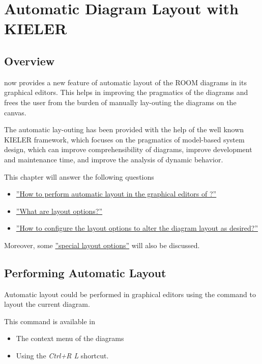 \section{Automatic Diagram Layout with KIELER}

\subsection{Overview}

\eTrice{} now provides a new feature of automatic layout of the ROOM diagrams in its graphical editors. This 
helps in improving the pragmatics of the diagrams and frees the user from the burden of manually 
lay-outing the diagrams on the canvas. 

The automatic lay-outing has been provided with the help of the well known KIELER framework, which focuses 
on the pragmatics of model-based system design, which can improve comprehensibility of diagrams, improve 
development and maintenance time, and improve the analysis of dynamic behavior.

This chapter will answer the following questions
\begin{itemize}
\item \hyperref[performLayout]{''How to perform automatic layout in the graphical editors of \eTrice{}?''}
\item \hyperref[layoutOptions]{''What are layout options?''}
\item \hyperref[configureOptions]{''How to configure the layout options to alter the diagram layout as 
desired?''}
\end{itemize}

Moreover, some \hyperref[specialOptions]{''special layout options''} will also be discussed.

\subsection{\label{performLayout}Performing Automatic Layout} 

Automatic layout could be performed in \eTrice{} graphical editors using the command to layout the current 
diagram.

This command is available in
\begin{itemize}
\item The context menu of the diagrams
\item Using the \textit{Ctrl+R L} shortcut.
\end{itemize}

